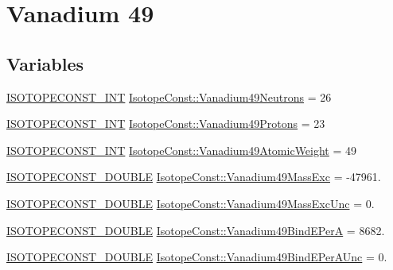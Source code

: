 \hypertarget{group___isotope_const-_vanadium-_v49}{}\section{Vanadium 49}
\label{group___isotope_const-_vanadium-_v49}
\subsection*{Variables}
\begin{DoxyCompactItemize}
\item 
\mbox{\hyperlink{group___isotope_const-_macros_ga5f18360b3e99483a35c32d789e62621c}{I\+S\+O\+T\+O\+P\+E\+C\+O\+N\+S\+T\+\_\+\+I\+NT}} \mbox{\hyperlink{group___isotope_const-_vanadium-_v49_ga602cde2998e51e248956db3f3b8d4b7d}{Isotope\+Const\+::\+Vanadium49\+Neutrons}} = 26
\item 
\mbox{\hyperlink{group___isotope_const-_macros_ga5f18360b3e99483a35c32d789e62621c}{I\+S\+O\+T\+O\+P\+E\+C\+O\+N\+S\+T\+\_\+\+I\+NT}} \mbox{\hyperlink{group___isotope_const-_vanadium-_v49_ga87ee31298609e190da028cf11a8457a9}{Isotope\+Const\+::\+Vanadium49\+Protons}} = 23
\item 
\mbox{\hyperlink{group___isotope_const-_macros_ga5f18360b3e99483a35c32d789e62621c}{I\+S\+O\+T\+O\+P\+E\+C\+O\+N\+S\+T\+\_\+\+I\+NT}} \mbox{\hyperlink{group___isotope_const-_vanadium-_v49_ga69e71744af1a053e5bafa800c4bf8d5d}{Isotope\+Const\+::\+Vanadium49\+Atomic\+Weight}} = 49
\item 
\mbox{\hyperlink{group___isotope_const-_macros_ga8f45a7272ce02c0b4c65c44636ed719a}{I\+S\+O\+T\+O\+P\+E\+C\+O\+N\+S\+T\+\_\+\+D\+O\+U\+B\+LE}} \mbox{\hyperlink{group___isotope_const-_vanadium-_v49_ga242c31b22bb5d7e1f2f1d38751bd5b7e}{Isotope\+Const\+::\+Vanadium49\+Mass\+Exc}} = -\/47961.
\item 
\mbox{\hyperlink{group___isotope_const-_macros_ga8f45a7272ce02c0b4c65c44636ed719a}{I\+S\+O\+T\+O\+P\+E\+C\+O\+N\+S\+T\+\_\+\+D\+O\+U\+B\+LE}} \mbox{\hyperlink{group___isotope_const-_vanadium-_v49_ga390a0c0b646d8bd334e79a2df9fb56aa}{Isotope\+Const\+::\+Vanadium49\+Mass\+Exc\+Unc}} = 0.
\item 
\mbox{\hyperlink{group___isotope_const-_macros_ga8f45a7272ce02c0b4c65c44636ed719a}{I\+S\+O\+T\+O\+P\+E\+C\+O\+N\+S\+T\+\_\+\+D\+O\+U\+B\+LE}} \mbox{\hyperlink{group___isotope_const-_vanadium-_v49_gacd60db89469aa636bceae95f3a3b2e08}{Isotope\+Const\+::\+Vanadium49\+Bind\+E\+PerA}} = 8682.
\item 
\mbox{\hyperlink{group___isotope_const-_macros_ga8f45a7272ce02c0b4c65c44636ed719a}{I\+S\+O\+T\+O\+P\+E\+C\+O\+N\+S\+T\+\_\+\+D\+O\+U\+B\+LE}} \mbox{\hyperlink{group___isotope_const-_vanadium-_v49_ga7684cedaf4d6827c59a5901eecb0969c}{Isotope\+Const\+::\+Vanadium49\+Bind\+E\+Per\+A\+Unc}} = 0.

\end{DoxyCompactItemize}

